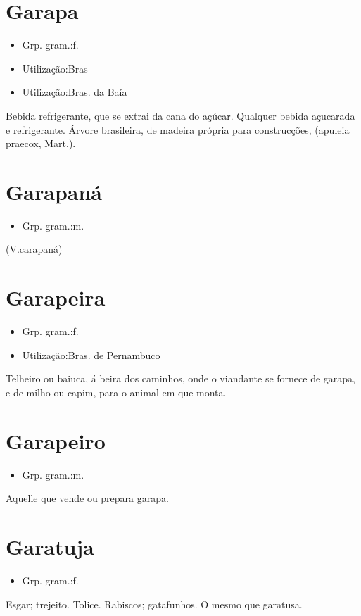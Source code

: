 \section{Garapa}
\begin{itemize}
\item {Grp. gram.:f.}
\end{itemize}
\begin{itemize}
\item {Utilização:Bras}
\end{itemize}
\begin{itemize}
\item {Utilização:Bras. da Baía}
\end{itemize}
Bebida refrigerante, que se extrai da cana do açúcar.
Qualquer bebida açucarada e refrigerante.
Árvore brasileira, de madeira própria para construcções, (\textunderscore apuleia praecox\textunderscore , Mart.).
\section{Garapaná}
\begin{itemize}
\item {Grp. gram.:m.}
\end{itemize}
(V.carapaná)
\section{Garapeira}
\begin{itemize}
\item {Grp. gram.:f.}
\end{itemize}
\begin{itemize}
\item {Utilização:Bras. de Pernambuco}
\end{itemize}
Telheiro ou baiuca, á beira dos caminhos, onde o viandante se fornece de garapa, e de milho ou capim, para o animal em que monta.
\section{Garapeiro}
\begin{itemize}
\item {Grp. gram.:m.}
\end{itemize}
Aquelle que vende ou prepara garapa.
\section{Garatuja}
\begin{itemize}
\item {Grp. gram.:f.}
\end{itemize}
Esgar; trejeito.
Tolice.
Rabiscos; gatafunhos.
O mesmo que \textunderscore garatusa\textunderscore .
